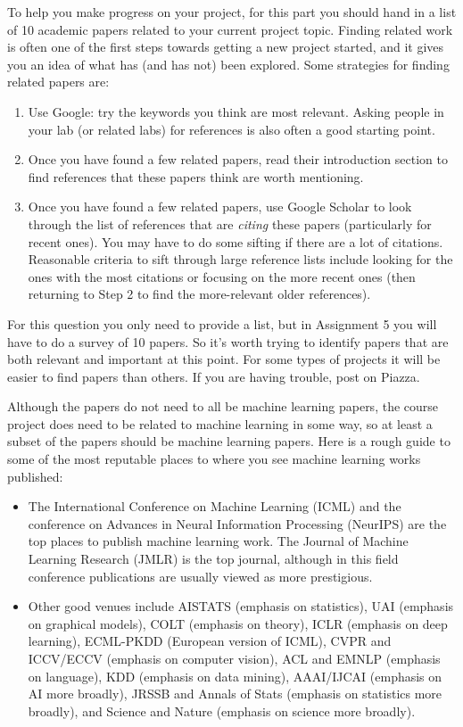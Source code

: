 \documentclass{article}
\def\blu#1{{\color{blu}#1}}
\def\items#1{\begin{itemize}#1\end{itemize}}
\def\enum#1{\begin{enumerate}#1\end{enumerate}}
\begin{document}
To help you make progress on your project, for this part you should \blu{hand in a list of 10 academic papers} related to your current project topic. Finding related work is often one of the first steps towards getting a new project started, and it gives you an idea of what has (and has not) been explored. Some strategies for finding related papers are:
\enum{
\item Use Google: try the keywords you think are most relevant. Asking people in your lab (or related labs) for references is also often a good starting point.
\item Once you have found a few related papers, read their introduction section to find references that these papers think are worth mentioning.
\item Once you have found a few related papers, use Google Scholar to look through the list of references that are \emph{citing} these papers (particularly for recent ones). You may have to do some sifting if there are a lot of citations. Reasonable criteria to sift through large reference lists include looking for the ones with the most citations or focusing on the more recent ones (then returning to Step 2 to find the more-relevant older references).
}
For this question you only need to provide a list, but in Assignment 5 you will have to do a survey of 10 papers. So it's worth trying to identify papers that are both relevant and important at this point.
For some types of projects it will be easier to find papers than others. If you are having trouble, post on Piazza.

Although the papers do not need to all be machine learning papers, the course project does need to be related to machine learning in some way, so at least a subset of the papers should be machine learning papers. Here is a rough guide to some of the most reputable places to where you see machine learning works published:
\items{
\item The International Conference on Machine Learning (ICML) and the conference on Advances in Neural Information Processing (NeurIPS) are the top places to publish machine learning work. The Journal of Machine Learning Research (JMLR) is the top journal, although in this field conference publications are usually viewed as more prestigious.
\item Other good venues include AISTATS (emphasis on statistics), UAI (emphasis on graphical models), COLT (emphasis on theory), ICLR (emphasis on deep learning), ECML-PKDD (European version of ICML), CVPR and ICCV/ECCV (emphasis on computer vision), ACL and EMNLP (emphasis on language), KDD (emphasis on data mining),  AAAI/IJCAI (emphasis on AI more broadly), JRSSB and Annals of Stats (emphasis on statistics more broadly), and Science and Nature (emphasis on science more broadly).
}
\end{document}
